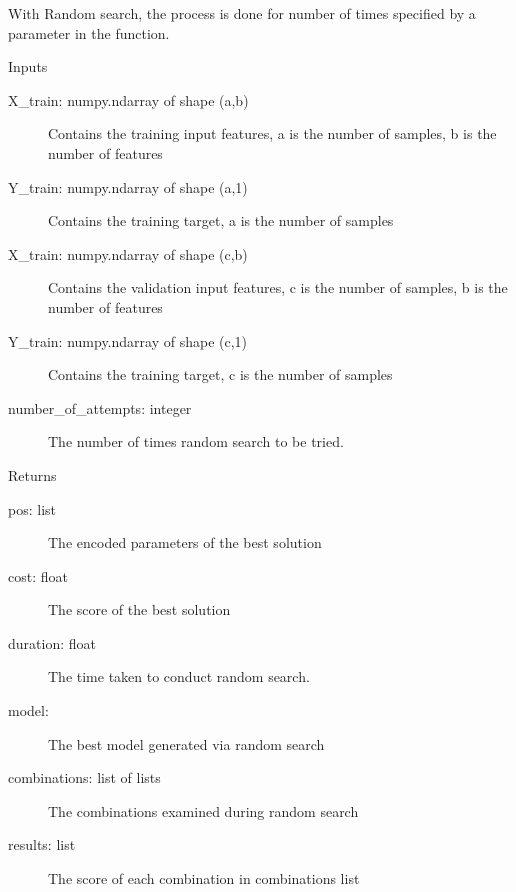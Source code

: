 \documentclass[letterpaper,10pt,english]{sphinxmanual}
\begin{document}
\begin{fulllineitems}
\begin{fulllineitems}
With Random search, the process is done for number of times specified by a parameter in the function.

Inputs
\begin{description}
\item[{X\_train: numpy.ndarray of shape (a,b)}] \leavevmode
Contains the training input features, a is the number of samples, b is the number of features

\item[{Y\_train: numpy.ndarray of shape (a,1)}] \leavevmode
Contains the training target, a is the number of samples

\item[{X\_train: numpy.ndarray of shape (c,b)}] \leavevmode
Contains the validation input features, c is the number of samples, b is the number of features

\item[{Y\_train: numpy.ndarray of shape (c,1)}] \leavevmode
Contains the training target, c is the number of samples

\item[{number\_of\_attempts: integer}] \leavevmode
The number of times random search to be tried.

\end{description}

Returns
\begin{description}
\item[{pos: list}] \leavevmode
The encoded parameters of the best solution

\item[{cost: float}] \leavevmode
The score of the best solution

\item[{duration: float}] \leavevmode
The time taken to conduct random search.

\item[{model:}] \leavevmode
The best model generated via random search

\item[{combinations: list of lists}] \leavevmode
The combinations examined during random search

\item[{results: list}] \leavevmode
The score of each combination in combinations list

\end{description}

\end{fulllineitems}



\end{fulllineitems}
\end{document}
